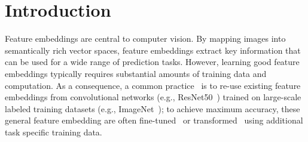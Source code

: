 \documentclass[10pt,twocolumn,letterpaper]{article}
\begin{document}
\section{Introduction}%

Feature embeddings are central to 
computer vision.
By mapping images into semantically rich vector spaces, feature embeddings extract key information that can be used for a wide range of prediction tasks.  
However, learning good feature embeddings typically requires substantial amounts of training data and computation.  
As a consequence, a common practice~\cite{donahue2014decaf,girshick2014rich,zeiler2014visualizing} is to re-use existing feature embeddings from convolutional networks (e.g., ResNet50~\cite{he2016deep}) trained on large-scale labeled training datasets (e.g., ImageNet~\cite{russakovsky2015imagenet}); to achieve maximum accuracy, these general feature embedding are often fine-tuned~\cite{girshick2014rich,donahue2014decaf,zeiler2014visualizing} or transformed~\cite{Hoffman_cycada2017} using additional task specific training data. 
\end{document}
